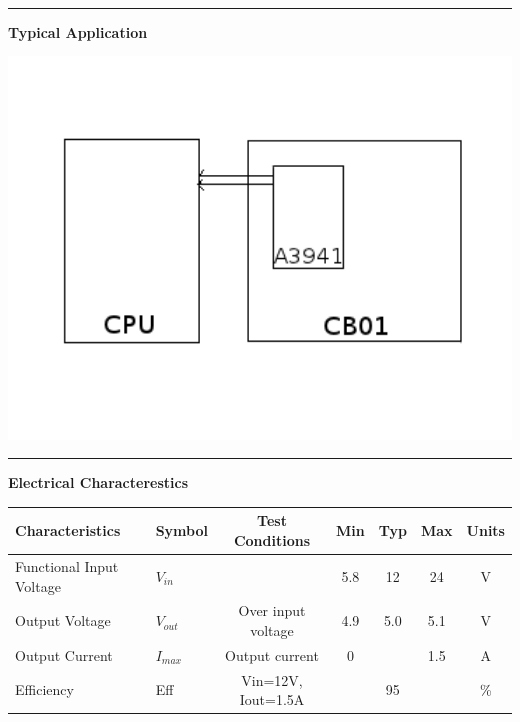 \documentclass{article}
\begin{document}
\\
\hspace{0.3in}
\hrule
\hspace{0.3in}
\begin{center} 
\large{\textbf{Typical Application}}
\end{center}
\begin{center}
\includegraphics[width=6in]{cb01_typical.png}
\end{center}
\hrule
\newpage
\large{\textbf{Electrical Characterestics}} \\
\begin{center}
\begin{tabular}{|l | l |c| c|c|c|c|}
\hline
Characteristics & Symbol &Test Conditions & Min & Typ & Max & Units \\ \hline
Functional Input Voltage& $V_{in}$& & 5.8&12&24&V \\ \hline 
Output Voltage & $V_{out}$ & Over input voltage& 4.9 & 5.0 & 5.1 & V \\ \hline
Output Current & $I_{max}$ &Output current& 0 & & 1.5 &A \\ \hline
Efficiency & Eff &Vin=12V, Iout=1.5A& & 95 &  & \% \\\hline
\hline
\end{tabular}
\end{center}
\end{document}
